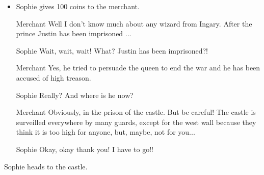 \begin{itemize}
\begin{itemize}
\begin{screenplay}
    Sophie goes away disconsolate.
    
\begin{dialogue}{Sophie}
I saw on the map there is another square in front of the castle, maybe we'll have better luck there.
\end{dialogue}

\end{screenplay}

  \item Sophie gives 100 coins to the merchant.
    
\begin{screenplay}

\begin{dialogue}{Merchant}
Well I don't know much about any wizard from Ingary. After the prince Justin has been imprisoned ...
\end{dialogue}

\begin{dialogue}[incredulous]{Sophie}
Wait, wait, wait! What? Justin has been imprisoned?!
\end{dialogue}
    
\begin{dialogue}{Merchant}
Yes, he tried to persuade the queen to end the war and he has been accused of high treason.
\end{dialogue}
    
\begin{dialogue}{Sophie}
Really? And where is he now?
\end{dialogue}
    
\begin{dialogue}{Merchant}
Obviously, in the prison of the castle. But be careful! The castle is surveilled everywhere by many guards, except for the west wall because they think it is too high for anyone, but, maybe, not for you...
\end{dialogue}
    
\begin{dialogue}[hasty]{Sophie}
Okay, okay thank you! I have to go!!
\end{dialogue}

\end{screenplay}

  \end{itemize}

\end{itemize}

\vspace{1em}

Sophie heads to the castle.

